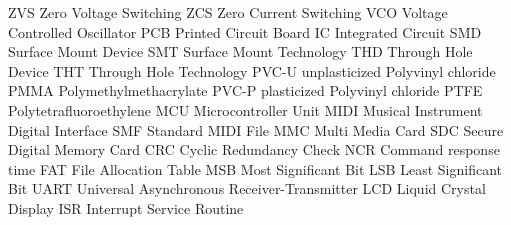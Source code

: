    {ZVS}    {Zero Voltage Switching}
   {ZCS}    {Zero Current Switching}
   {VCO}    {Voltage Controlled Oscillator}
   {PCB}    {Printed Circuit Board}
    {IC}     {Integrated Circuit}
   {SMD}    {Surface Mount Device}
   {SMT}    {Surface Mount Technology}
   {THD}    {Through Hole Device}
   {THT}    {Through Hole Technology}
  {PVC-U}  {unplasticized Polyvinyl chloride}
  {PMMA}   {Polymethylmethacrylate}
  {PVC-P}  {plasticized Polyvinyl chloride}
  {PTFE}   {Polytetrafluoroethylene}
   {MCU}    {Microcontroller Unit}
  {MIDI}   {Musical Instrument Digital Interface}
   {SMF}    {Standard MIDI File}
   {MMC}    {Multi Media Card}
   {SDC}    {Secure Digital Memory Card}
   {CRC}    {Cyclic Redundancy Check}
   {NCR}    {Command response time}
   {FAT}    {File Allocation Table}
   {MSB}    {Most Significant Bit}
   {LSB}    {Least Significant Bit}
  {UART}   {Universal Asynchronous Receiver-Transmitter}
   {LCD}    {Liquid Crystal Display}
   {ISR}    {Interrupt Service Routine}

